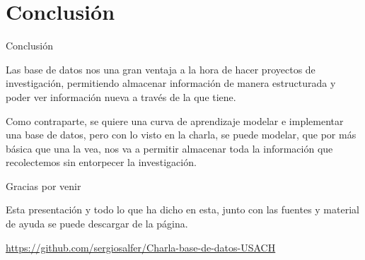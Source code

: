 \documentclass[11pt]{beamer}
\begin{document}
\section{Conclusión}

\begin{frame}{Conclusión}

Las base de datos nos una gran ventaja a la hora de hacer proyectos de investigación, permitiendo almacenar información de manera estructurada y poder ver información nueva a través de la que tiene.

Como contraparte, se quiere una curva de aprendizaje modelar e implementar una base de datos, pero con lo visto en la charla, se puede modelar, que por más básica que una la vea, nos va a permitir almacenar toda la información que recolectemos sin entorpecer la investigación.

\end{frame}


\begin{frame}{Gracias por venir}

Esta presentación y todo lo que ha dicho en esta, junto con las fuentes y material de ayuda se puede descargar de la página.

\begin{center}
	\url{https://github.com/sergiosalfer/Charla-base-de-datos-USACH}
\end{center}



\end{frame}
\end{document}
